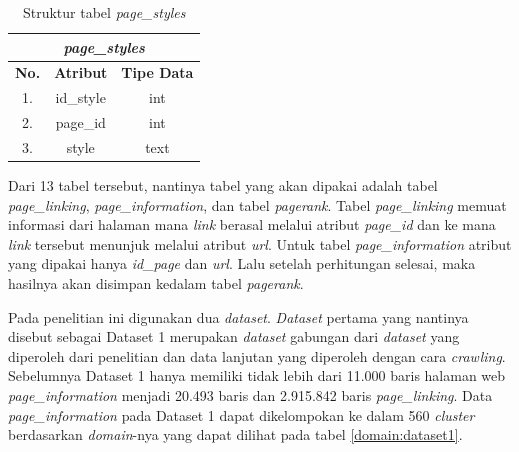 \begin{table}[h!]
	\centering
	\caption{Struktur tabel \textit{page\_styles}}
	\label{table:entity_page_styles}
	\begin{tabular}{|c|c|c|}
		\hline
		\multicolumn{3}{|c|}{\textit{page\_styles}} \\
		\hline
		\textbf{No.} & \textbf{Atribut} & \textbf{Tipe Data} \\
		\hline
		1. & id\_style & int \\
		2. & page\_id & int \\
		3. & style & text \\
		\hline
	\end{tabular}
\end{table}

Dari 13 tabel tersebut, nantinya tabel yang akan dipakai adalah tabel \textit{page\_linking}, \textit{page\_information}, dan tabel \textit{pagerank}. Tabel \textit{page\_linking} memuat informasi dari halaman mana \textit{link} berasal melalui atribut \textit{page\_id} dan ke mana \textit{link} tersebut menunjuk melalui atribut \textit{url}. Untuk tabel \textit{page\_information} atribut yang dipakai hanya \textit{id\_page} dan \textit{url}. Lalu setelah perhitungan selesai, maka hasilnya akan disimpan kedalam tabel \textit{pagerank}.

Pada penelitian ini digunakan dua \textit{dataset}. \textit{Dataset} pertama yang nantinya disebut sebagai Dataset 1 merupakan \textit{dataset} gabungan dari \textit{dataset} yang diperoleh dari penelitian \citet{khatulistiwa2022SearchEngine} dan data lanjutan yang diperoleh dengan cara \textit{crawling}. Sebelumnya Dataset 1 hanya memiliki tidak lebih dari 11.000 baris halaman web \textit{page\_information} menjadi 20.493 baris dan 2.915.842 baris \textit{page\_linking}. Data \textit{page\_information} pada Dataset 1 dapat dikelompokan ke dalam 560 \textit{cluster} berdasarkan \textit{domain}-nya yang dapat dilihat pada tabel \ref{domain:dataset1}.

